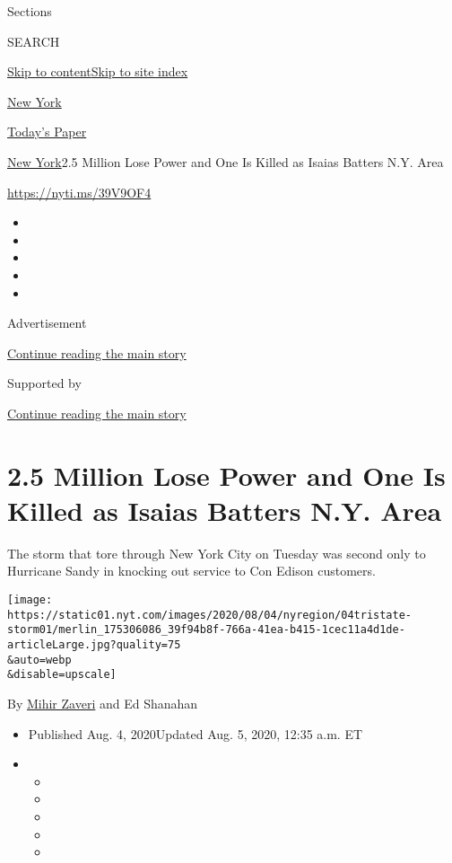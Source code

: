 Sections

SEARCH

\protect\hyperlink{site-content}{Skip to
content}\protect\hyperlink{site-index}{Skip to site index}

\href{https://www.nytimes.com/section/nyregion}{New York}

\href{https://myaccount.nytimes.com/auth/login?response_type=cookie\&client_id=vi}{}

\href{https://www.nytimes.com/section/todayspaper}{Today's Paper}

\href{/section/nyregion}{New York}\textbar{}2.5 Million Lose Power and
One Is Killed as Isaias Batters N.Y. Area

\url{https://nyti.ms/39V9OF4}

\begin{itemize}
\item
\item
\item
\item
\item
\end{itemize}

Advertisement

\protect\hyperlink{after-top}{Continue reading the main story}

Supported by

\protect\hyperlink{after-sponsor}{Continue reading the main story}

\hypertarget{25-million-lose-power-and-one-is-killed-as-isaias-batters-ny-area}{%
\section{2.5 Million Lose Power and One Is Killed as Isaias Batters N.Y.
Area}\label{25-million-lose-power-and-one-is-killed-as-isaias-batters-ny-area}}

The storm that tore through New York City on Tuesday was second only to
Hurricane Sandy in knocking out service to Con Edison customers.

\texttt{[image: https://static01.nyt.com/images/2020/08/04/nyregion/04tristate-storm01/merlin\_175306086\_39f94b8f-766a-41ea-b415-1cec11a4d1de-articleLarge.jpg?quality=75\\\&auto=webp\\\&disable=upscale]}

By \href{https://www.nytimes.com/by/mihir-zaveri}{Mihir Zaveri} and Ed
Shanahan

\begin{itemize}
\item
  Published Aug. 4, 2020Updated Aug. 5, 2020, 12:35 a.m. ET
\item
  \begin{itemize}
  \item
  \item
  \item
  \item
  \item
  \end{itemize}
\end{itemize}

